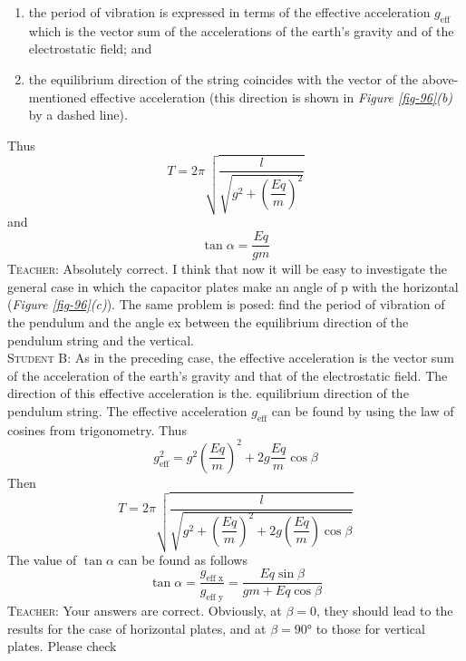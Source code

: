 \documentclass[a4paper,sfsidenotes]{tufte-book}
\begin{document}
\begin{enumerate}[label=(\arabic*)]
\item the period of vibration is expressed in terms of the effective acceleration $g_{\text{eff}}$ which is the vector sum of the accelerations of the earth's gravity and of the electrostatic field; and 
\item the equilibrium direction of the string coincides with the vector of the above-mentioned effective acceleration (this direction is shown in \emph{Figure \ref{fig-96}(b)} by a dashed line). 
\end{enumerate}
Thus
\begin{equation}%
T = 2 \pi \sqrt{ \dfrac{l}{\sqrt{ g^{2}+ \left(\dfrac{Eq}{m} \right)^{2}}}}
\label{eq-152}
\end{equation}
and
\begin{equation}%
\tan \alpha = \dfrac{Eq}{gm}
\label{eq-153}
\end{equation}
\textsc{Teacher:} Absolutely correct. I think that now it will be easy to investigate the general case in which the capacitor plates make an angle of p with the horizontal (\emph{Figure \ref{fig-96}(c)}). The same problem is posed: find the period of vibration of the pendulum and the angle ex between the equilibrium direction of the pendulum string and the vertical.
\\
\textsc{Student B:} As in the preceding case, the effective acceleration is the vector sum of the acceleration of the earth's gravity and that of the electrostatic field. The direction of this effective acceleration is the. equilibrium direction of the pendulum string. The effective acceleration $g_{\text{eff}}$ can be found by using the law of cosines from trigonometry. Thus
\begin{equation*}
g_{\text{eff}}^{2} = g^{2} \left( \frac{Eq}{m} \right)^{2} + 2g \frac{Eq}{m} \cos \beta
\end{equation*}
Then
\begin{equation}%
T = 2 \pi \sqrt{ \dfrac{l}{\sqrt{ g^{2}+ \left(\dfrac{Eq}{m} \right)^{2} +2g \left( \dfrac{Eq}{m} \right) \cos \beta}}}
\label{eq-154}
\end{equation}
The value of $\tan \alpha$ can be found as follows
\begin{equation}%
\tan \alpha =  \dfrac{g_{\text{eff x}}}{g_{\text{eff y}}} = \frac{Eq \sin \beta}{gm + Eq \cos \beta}
\label{eq-155}
\end{equation}
\textsc{Teacher:} Your answers are correct. Obviously, at $\beta=0$, they should lead to the results for the case of horizontal plates, and at $\beta =\ang{90}$ to those for vertical plates. Please check
\end{document}
